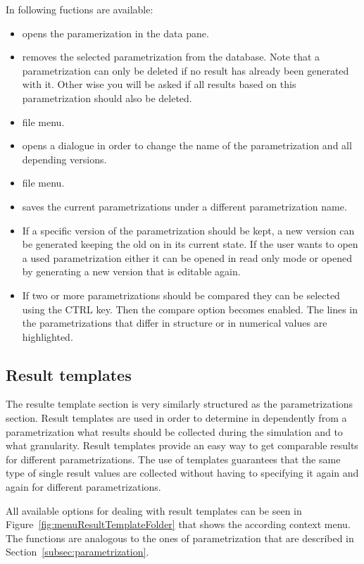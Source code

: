 In following fuctions are available:
\begin{itemize}
\item {} opens the paramerization in the data pane.
\item {} removes the selected parametrization from the database. Note that a parametrization can only be deleted if no result has already been generated with it. Other wise you will be asked if all results based on this parametrization should also be deleted.
\item {} \cf file menu.
\item {} opens a dialogue in order to change the name of the parametrization and all depending versions.
\item {} \cf file menu.
\item {} saves the current parametrizations under a different parametrization name.
\item {} If a specific version of the parametrization should be kept, a new version can be generated keeping the old on in its current state. If the user wants to open a used parametrization either it can be opened in read only mode or opened by generating a new version that is editable again.
\item {} If two or more parametrizations should be compared they can be selected using the CTRL key. Then the compare option becomes enabled. The lines in the parametrizations that differ in structure or in numerical values are highlighted.
\end{itemize}

\subsection{Result templates}
\label{subsec:resultTemplates}
The resulte template section is very similarly structured as the parametrizations section. Result templates are used in order to determine in dependently from a parametrization what results should be collected during the simulation and to what granularity. Result templates provide an easy way to get comparable results for different parametrizations. The use of templates guarantees that the same type of single result values are collected without having to specifying it again and again for different parametrizations.

All available options for dealing with result templates can be seen in Figure~\ref{fig:menuResultTemplateFolder} that shows the according context menu. The functions are analogous to the ones of parametrization that are described in Section~\ref{subsec:parametrization}.

